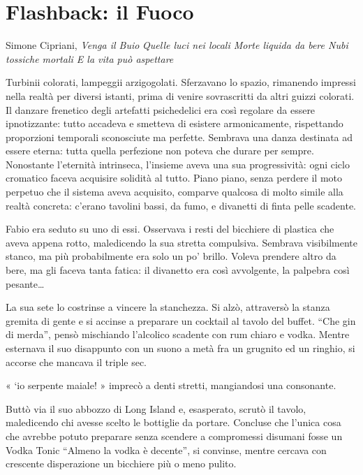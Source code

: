 \chapter{Flashback: il Fuoco}

\begin{chapquote}{Simone Cipriani, \textit{Venga il Buio}}
	\textit{Quelle luci nei locali\newline
		Morte liquida da bere\newline
		Nubi tossiche mortali\newline
		E la vita può aspettare
	}
\end{chapquote}

Turbinii colorati, lampeggii arzigogolati. Sferzavano lo spazio, rimanendo impressi nella realtà per diversi istanti, prima di venire sovrascritti da altri guizzi colorati. Il danzare frenetico degli artefatti psichedelici era così regolare da essere ipnotizzante: tutto accadeva e smetteva di esistere armonicamente, rispettando proporzioni temporali sconosciute ma perfette. Sembrava una danza destinata ad essere eterna: tutta quella perfezione non poteva che durare per sempre. Nonostante l'eternità intrinseca, l'insieme aveva una sua progressività: ogni ciclo cromatico faceva acquisire solidità al tutto. Piano piano, senza perdere il moto perpetuo che il sistema aveva acquisito, comparve qualcosa di molto simile alla realtà concreta: c'erano tavolini bassi, da fumo, e divanetti di finta pelle scadente.

Fabio era seduto su uno di essi. Osservava i resti del bicchiere di plastica che aveva appena rotto, maledicendo la sua stretta compulsiva. Sembrava visibilmente stanco, ma più probabilmente era solo un po' brillo. Voleva prendere altro da bere, ma gli faceva tanta fatica: il divanetto era così avvolgente, la palpebra così pesante\ldots

La sua sete lo costrinse a vincere la stanchezza. Si alzò, attraversò la stanza gremita di gente e si accinse a preparare un cocktail al tavolo del buffet. ``Che gin di merda'', pensò mischiando l'alcolico scadente con rum chiaro e vodka. Mentre esternava il suo disappunto con un suono a metà fra un grugnito ed un ringhio, si accorse che mancava il triple sec.

« `io serpente maiale! » imprecò a denti stretti, mangiandosi una consonante.

Buttò via il suo abbozzo di Long Island e, esasperato, scrutò il tavolo, maledicendo chi avesse scelto le bottiglie da portare. Concluse che l'unica cosa che avrebbe potuto preparare senza scendere a compromessi disumani fosse un Vodka Tonic  ``Almeno la vodka è decente'', si convinse, mentre cercava con crescente disperazione un bicchiere più o meno pulito.


